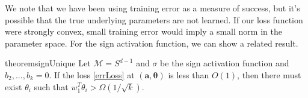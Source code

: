 We note that we have been using training error as a measure of success, but it's possible that the true underlying parameters are not learned. If our loss function were strongly convex, small training error would imply a small norm in the parameter space. For the sign activation function, we can show a related result.

\begin{restatable}{theorem}{signUnique}
\label{SignUnique}
Let $\mathcal{M} = S^{d-1}$ and $\sigma$ be the sign activation function and $b_2,...,b_k = 0$. If the loss \eqref{errLoss} at $(\boldsymbol{a,\theta})$ is less than $O(1)$, then there must exist $\theta_i$ such that $w_1^T\theta_i > \Omega(1/\sqrt{k})$.
\end{restatable}


